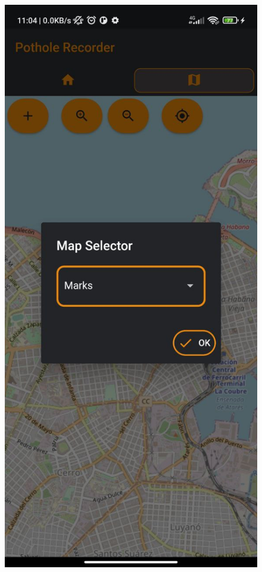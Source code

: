 \begin{figure}[htb]
		\includegraphics[scale = 0.175]{Graphics/load_marks_to_map_2.jpg}

\end{figure}
